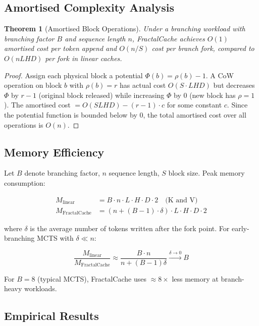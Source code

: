 \documentclass[10pt,twocolumn]{article}
\newtheorem{theorem}{Theorem}
\begin{document}
\subsection{Amortised Complexity Analysis}

\begin{theorem}[Amortised Block Operations]
Under a branching workload with branching factor $B$ and sequence length $n$, FractalCache achieves $O(1)$ amortised cost per token append and $O(n/S)$ cost per branch fork, compared to $O(nLHD)$ per fork in linear caches.
\end{theorem}

\begin{proof}
Assign each physical block a potential $\Phi(b) = \rho(b) - 1$. A CoW operation on block $b$ with $\rho(b) = r$ has actual cost $O(S \cdot LHD)$ but decreases $\Phi$ by $r - 1$ (original block released) while increasing $\Phi$ by $0$ (new block has $\rho = 1$). The amortised cost $= O(SLHD) - (r-1) \cdot c$ for some constant $c$. Since the potential function is bounded below by $0$, the total amortised cost over all operations is $O(n)$.
\end{proof}

\subsection{Memory Efficiency}

Let $B$ denote branching factor, $n$ sequence length, $S$ block size. Peak memory consumption:

\begin{align}
M_{\text{linear}} &= B \cdot n \cdot L \cdot H \cdot D \cdot 2 \quad \text{(K and V)} \\
M_{\text{FractalCache}} &= \left(n + (B-1) \cdot \delta\right) \cdot L \cdot H \cdot D \cdot 2
\end{align}

where $\delta$ is the average number of tokens written after the fork point. For early-branching MCTS with $\delta \ll n$:

\begin{equation}
\frac{M_{\text{linear}}}{M_{\text{FractalCache}}} \approx \frac{B \cdot n}{n + (B-1)\delta} \xrightarrow{\delta \to 0} B
\end{equation}

For $B = 8$ (typical MCTS), FractalCache uses $\approx 8\times$ less memory at branch-heavy workloads.

\subsection{Empirical Results}
\end{document}
